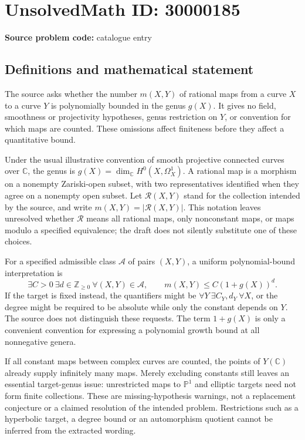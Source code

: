 \documentclass[11pt]{article}
\newcommand{\Z}{\mathbb{Z}}
\newcommand{\C}{\mathbb{C}}
\newcommand{\PP}{\mathbb{P}}
\begin{document}
\section*{UnsolvedMath ID: 30000185}
\textbf{Source problem code:} catalogue entry
\subsection{Definitions and mathematical statement}
The source asks whether the number \(m(X,Y)\) of rational maps from a curve \(X\) to a curve \(Y\) is polynomially bounded in the genus \(g(X)\). It gives no field, smoothness or projectivity hypotheses, genus restriction on \(Y\), or convention for which maps are counted. These omissions affect finiteness before they affect a quantitative bound.

Under the usual illustrative convention of smooth projective connected curves over \(\C\), the genus is \(g(X)=\dim_{\C}H^0(X,\Omega_X^1)\). A rational map is a morphism on a nonempty Zariski-open subset, with two representatives identified when they agree on a nonempty open subset. Let \(\mathcal R(X,Y)\) stand for the collection intended by the source, and write \(m(X,Y)=|\mathcal R(X,Y)|\). This notation leaves unresolved whether \(\mathcal R\) means all rational maps, only nonconstant maps, or maps modulo a specified equivalence; the draft does not silently substitute one of these choices.

For a specified admissible class \(\mathcal A\) of pairs \((X,Y)\), a uniform polynomial-bound interpretation is
\[
 \exists C>0\ \exists d\in\Z_{\geq0}\ \forall (X,Y)\in\mathcal A,
 \qquad m(X,Y)\leq C(1+g(X))^d.
\]
If the target is fixed instead, the quantifiers might be \(\forall Y\ \exists C_Y,d_Y\ \forall X\), or the degree might be required to be absolute while only the constant depends on \(Y\). The source does not distinguish these requests. The term \(1+g(X)\) is only a convenient convention for expressing a polynomial growth bound at all nonnegative genera.

If all constant maps between complex curves are counted, the points of \(Y(\C)\) already supply infinitely many maps. Merely excluding constants still leaves an essential target-genus issue: unrestricted maps to \(\PP^1\) and elliptic targets need not form finite collections. These are missing-hypothesis warnings, not a replacement conjecture or a claimed resolution of the intended problem. Restrictions such as a hyperbolic target, a degree bound or an automorphism quotient cannot be inferred from the extracted wording.
\end{document}

